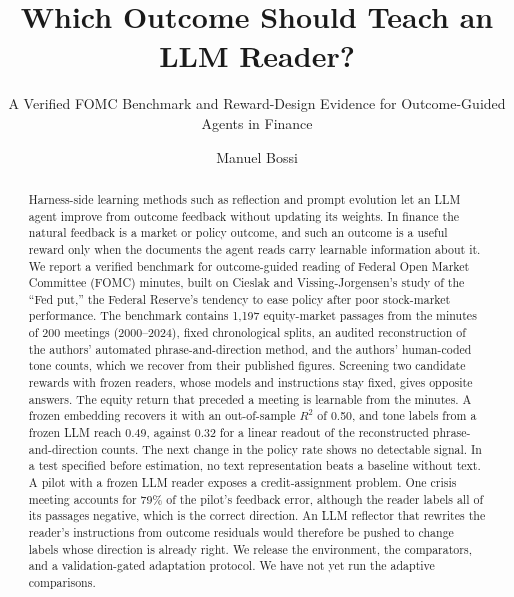 \documentclass[sigconf]{acmart}
\begin{document}
\title{Which Outcome Should Teach an LLM Reader?}
\subtitle{A Verified FOMC Benchmark and Reward-Design Evidence for Outcome-Guided Agents in Finance}

\author{Manuel Bossi}

\renewcommand{\shortauthors}{M. Bossi}
\setlength{\emergencystretch}{1.5em}

\begin{abstract}
Harness-side learning methods such as reflection and prompt evolution let an LLM agent improve from outcome feedback without updating its weights. In finance the natural feedback is a market or policy outcome, and such an outcome is a useful reward only when the documents the agent reads carry learnable information about it. We report a verified benchmark for outcome-guided reading of Federal Open Market Committee (FOMC) minutes, built on Cieslak and Vissing-Jorgensen's study of the ``Fed put,'' the Federal Reserve's tendency to ease policy after poor stock-market performance. The benchmark contains 1,197 equity-market passages from the minutes of 200 meetings (2000--2024), fixed chronological splits, an audited reconstruction of the authors' automated phrase-and-direction method, and the authors' human-coded tone counts, which we recover from their published figures. Screening two candidate rewards with frozen readers, whose models and instructions stay fixed, gives opposite answers. The equity return that preceded a meeting is learnable from the minutes. A frozen embedding recovers it with an out-of-sample $R^2$ of 0.50, and tone labels from a frozen LLM reach 0.49, against 0.32 for a linear readout of the reconstructed phrase-and-direction counts. The next change in the policy rate shows no detectable signal. In a test specified before estimation, no text representation beats a baseline without text. A pilot with a frozen LLM reader exposes a credit-assignment problem. One crisis meeting accounts for 79\% of the pilot's feedback error, although the reader labels all of its passages negative, which is the correct direction. An LLM reflector that rewrites the reader's instructions from outcome residuals would therefore be pushed to change labels whose direction is already right. We release the environment, the comparators, and a validation-gated adaptation protocol. We have not yet run the adaptive comparisons.
\end{abstract}
\end{document}
